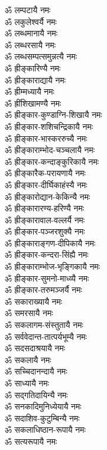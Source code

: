 \begin{multicols}{2}
\begin{flushleft}
ॐ लम्पटायै नमः\\
ॐ लकुलेश्वर्यै नमः\\
ॐ लब्धमानायै नमः\\
ॐ लब्धरसायै नमः\\
ॐ लब्धसम्पत्समुन्नत्यै नमः\hfill {}\\
ॐ ह्रीङ्कारिण्यै नमः\\
ॐ ह्रीङ्काराद्यायै नमः\\
ॐ ह्रीम्मध्यायै नमः\\
ॐ ह्रींशिखामण्यै नमः\\
ॐ ह्रीङ्कार-कुण्डाग्नि-शिखायै नमः\\
ॐ ह्रीङ्कार-शशिचन्द्रिकायै नमः\\
ॐ ह्रीङ्कार-भास्कररुच्यै नमः\\
ॐ ह्रीङ्काराम्भोद-चञ्चलायै नमः\\
ॐ ह्रीङ्कार-कन्दाङ्कुरिकायै नमः\\
ॐ ह्रीङ्कारैक-परायणायै नमः\hfill {}\\
ॐ ह्रीङ्कार-दीर्घिकाहंस्यै नमः\\
ॐ ह्रीङ्कारोद्यान-केकिन्यै नमः\\
ॐ ह्रीङ्कारारण्य-हरिण्यै नमः\\
ॐ ह्रीङ्कारावाल-वल्लर्यै नमः\\
ॐ ह्रीङ्कार-पञ्जरशुक्यै नमः\\
ॐ ह्रीङ्काराङ्गण-दीपिकायै नमः\\
ॐ ह्रीङ्कार-कन्दरा-सिंह्यै नमः\\
ॐ ह्रीङ्काराम्भोज-भृङ्गिकायै नमः\\
ॐ ह्रीङ्कार-सुमनो-माध्व्यै नमः\\
ॐ ह्रीङ्कार-तरुमञ्जर्यै नमः\hfill {}\\
ॐ सकाराख्यायै नमः\\
ॐ समरसायै नमः\\
ॐ सकलागम-संस्तुतायै नमः\\
ॐ सर्ववेदान्त-तात्पर्यभूम्यै नमः\\
ॐ सदसदाश्रयायै नमः\\
ॐ सकलायै नमः\\
ॐ सच्चिदानन्दायै नमः\\
ॐ साध्यायै नमः\\
ॐ सद्गतिदायिन्यै नमः\\
ॐ सनकादिमुनिध्येयायै नमः\hfill {}\\
ॐ सदाशिव-कुटुम्बिन्यै नमः\\
ॐ सकलाधिष्ठान-रूपायै नमः\\
ॐ सत्यरूपायै नमः\\

\end{flushleft}
\end{multicols}
